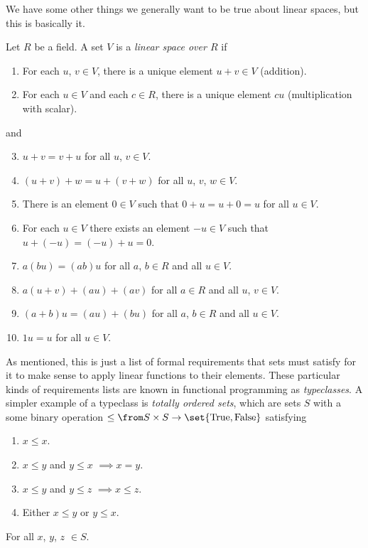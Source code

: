 We have some other things we generally want to be true about linear spaces, but this is basically it.
\begin{definition}\label{def:linear_space}
	Let $R$ be a field.
	A set $V$ is a \emph{linear space over $R$} if
	\begin{enumerate}
		\item For each $u$, $v \in V$, there is a unique element $u + v \in V$ (addition).
		\item For each $u \in V$ and each $c \in R$, there is a unique element $c u$ (multiplication with scalar).
	\end{enumerate}
	and
	\begin{enumerate}
		\setcounter{enumi}{2}
		\item $u + v = v + u$ for all $u$, $v \in V$.
		\item $(u + v) + w = u + (v + w)$ for all $u$, $v$, $w \in V$.
		\item There is an element $\mathit 0 \in V$ such that $\mathit 0 + u = u + \mathit 0 = u$ for all $u \in V$.
		\item For each $u \in V$ there exists an element $-u \in V$ such that $u + (-u) = (-u) + u = \mathit 0$.
		\item $a(b u) = (a b) u$ for all $a$, $b \in R$ and all $u \in V$.
		\item $a (u + v) + (a u) + (a v)$ for all $a \in R$ and all $u$, $v \in V$.
		\item $(a + b) u = (a u) + (b u)$ for all $a$, $b \in R$ and all $u \in V$.
		\item $1 u = u$ for all $u \in V$.
	\end{enumerate}
\end{definition}

As mentioned, this is just a list of formal requirements that sets must satisfy for it to make sense to apply linear functions to their elements.
These particular kinds of requirements lists are known in functional programming as \emph{typeclasses}.
A simpler example of a typeclass is \emph{totally ordered sets}, which are sets $S$ with a some binary operation $\leq \from S \times S \to \set{\textrm{True}, \textrm{False}}$ satisfying
\begin{enumerate}
	\item $x \leq x$.
	\item $x \leq y$ and $y \leq x$ $\implies x = y$.
	\item $x \leq y$ and $y \leq z$ $\implies x \leq z$.
	\item Either $x \leq y$ or $y \leq x$.
\end{enumerate}
For all $x$, $y$, $z$ $\in S$.

